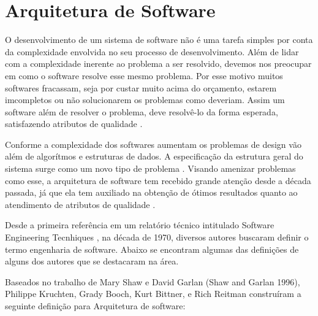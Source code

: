 \chapter{Arquitetura de Software}


O desenvolvimento de um sistema de software não é uma tarefa simples por conta da complexidade envolvida no seu processo de desenvolvimento. Além de lidar com a complexidade inerente ao problema a ser resolvido, devemos nos preocupar em como o software resolve esse mesmo problema. Por esse motivo muitos softwares fracassam, seja por custar muito acima do orçamento, estarem imcompletos ou não solucionarem os problemas como deveriam. Assim um software além de resolver o problema, deve resolvê-lo da forma esperada, satisfazendo atributos de qualidade \cite{germoglio2010fundamentos}.

Conforme a complexidade dos softwares aumentam os problemas de design vão além de algorítmos e estruturas de dados. A especificação da estrutura geral do sistema surge como um novo tipo de problema \cite{garlan1993introduction}. Visando amenizar problemas como esse, a arquitetura de software tem recebido grande atenção  desde a década passada, já que ela tem auxiliado na obtenção de ótimos resultados quanto ao atendimento de atributos de qualidade \cite{tese_prof_fabricio}. 




Desde a primeira referência em um relatório técnico intitulado Software Engineering Tecnhiques \cite{buxton1970software}, na década de 1970, diversos autores buscaram definir o termo engenharia de software. Abaixo se encontram algumas das definições de alguns dos autores que se destacaram na área.

Baseados no trabalho de Mary Shaw e David Garlan (Shaw and Garlan 1996), Philippe Kruchten, Grady Booch, Kurt Bittner, e Rich Reitman construíram a seguinte definição para Arquitetura de software:

